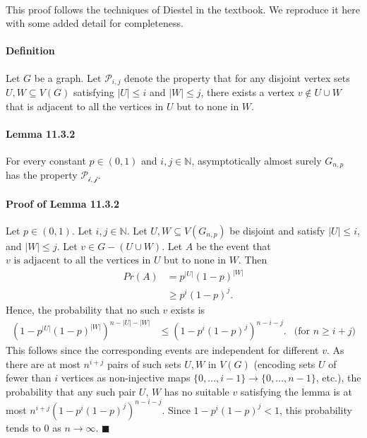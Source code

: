 \documentclass[letterpaper,12pt,oneside,onecolumn]{report}
\begin{document}
\paragraph{}
This proof follows the techniques of Diestel in the textbook. We reproduce it here with some added detail for completeness.
\paragraph{Definition}
Let $G$ be a graph. Let $\mathcal{P}_{i,j}$ denote the property that for any disjoint vertex sets $U, W \subseteq V(G)$ satisfying $|U| \leq i$ and $|W| \leq j$, there exists a vertex $v \not\in U \cup W$ that is adjacent to all the vertices in $U$ but to none in $W$.
\paragraph{Lemma 11.3.2} For every constant $p \in (0,1)$ and $i,j \in \mathbb{N}$, asymptotically almost surely $G_{n,p}$ has the property $\mathcal{P_{i,j}}$.
\paragraph{Proof of Lemma 11.3.2}
Let $p \in (0,1)$. Let $i,j \in \mathbb{N}$. Let $U, W \subseteq V(G_{n,p})$ be disjoint and satisfy $|U| \leq i$, and $|W| \leq j$. Let $v \in G - (U \cup W)$. Let $A$ be the event that $v \text{ is adjacent to all the vertices in $U$ but to none in $W$}$. Then 
\begin{align*}
Pr(A) &= p^{|U|}(1-p)^{|W|} \\
&\geq p^i(1-p)^j.
\end{align*}
Hence, the probability that no such $v$ exists is 
\begin{align*}
(1 - p^{|U|}(1-p)^{|W|})^{n-|U|-|W|} &\leq (1-p^i(1-p)^j)^{n-i-j}. &\text{(for $n \geq i + j$)}
\end{align*}
This follows since the corresponding events are independent for different $v$. As there are at most $n^{i+j}$ pairs of such sets $U,W$ in $V(G)$ (encoding sets $U$ of fewer than $i$ vertices as non-injective maps $\{0,\dots,i-1\} \rightarrow \{0, \dots, n-1\}$, etc.), the probability that any such pair $U$, $W$ has no suitable $v$ satisfying the lemma is at most $n^{i+j}(1-p^i(1-p)^j)^{n-i-j}$. Since $1-p^i(1-p)^j < 1$, this probability tends to $0$ as $n \rightarrow \infty$. $\blacksquare$
\end{document}

